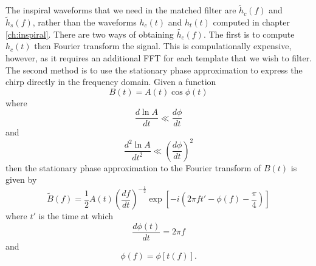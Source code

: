 The inspiral waveforms that we need in the matched filter are $\tilde{h}_c(f)$
and $\tilde{h}_s(f)$, rather than the waveforms $h_c(t)$ and $h_t(t)$ computed
in chapter \ref{ch:inspiral}. There are two ways of obtaining $\tilde{h_c}(f)$.
The first is to compute $h_c(t)$ then Fourier transform the signal. This is
compulationally expensive, however, as it requires an additional FFT for each
template that we wish to filter. The second method is to use the stationary phase
approximation\cite{Mathews:1992} to express the chirp directly in the frequency
domain\cite{WillWiseman:1996,Cutler:1994}. Given a function
\begin{equation}
B(t) = A(t) \cos \phi(t)
\end{equation}
where
\begin{equation}
\frac{d\ln A}{dt} \ll \frac{d\phi}{dt}
\end{equation}
and
\begin{equation}
\frac{d^2\ln A}{dt^2} \ll \left(\frac{d\phi}{dt}\right)^2
\end{equation}
then the stationary phase approximation to the Fourier transform of $B(t)$ is
given by
\begin{equation}
\tilde{B}(f) = \frac{1}{2} A(t) \left(\frac{df}{dt}\right)^{-\frac{1}{2}}
\exp\left[ -i \left(2\pi f t' - \phi(f) - \frac{\pi}{4} \right)\right]
\end{equation}
where $t'$ is the time at which
\begin{equation}
\frac{d\phi(t)}{dt} = 2\pi f
\end{equation}
and
\begin{equation}
\phi(f) = \phi\left[t(f)\right].
\end{equation}

